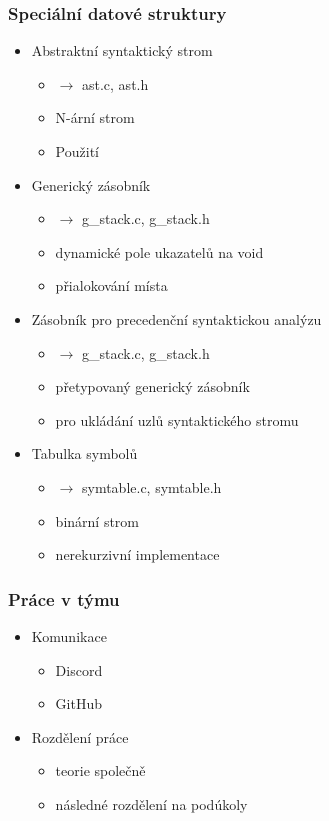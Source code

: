 \documentclass[10pt]{beamer}
\begin{document}

\begin{frame}
\frametitle{Speciální datové struktury}
\begin{itemize}[<+->]
\item Abstraktní syntaktický strom
	\begin{itemize}[<2->]
	\item $\rightarrow$ ast.c, ast.h
	\item N-ární strom
	\item Použití
	\end{itemize}
\pause
\vspace{0.2cm}
\item Generický zásobník
	\begin{itemize}[<4->]
	\item $\rightarrow$ g\_stack.c, g\_stack.h
	\item dynamické pole ukazatelů na void
	\item přialokování místa
	\end{itemize}
\pause
\vspace{0.2cm}
\item Zásobník pro precedenční syntaktickou analýzu
	\begin{itemize}[<6->]
	\item $\rightarrow$ g\_stack.c, g\_stack.h
	\item přetypovaný generický zásobník
	\item pro ukládání uzlů syntaktického stromu
	\end{itemize}
\pause
\vspace{0.2cm}
\item Tabulka symbolů
	\begin{itemize}[<8->]
	\item $\rightarrow$ symtable.c, symtable.h
	\item binární strom
	\item nerekurzivní implementace
	\end{itemize}
\end{itemize}
\end{frame}


\begin{frame}
\frametitle{Práce v týmu}
\begin{itemize}[<+->]
\item Komunikace
	\begin{itemize}[<2->]
	\item Discord
	\item GitHub
	\end{itemize}
\pause
\vspace{0.2cm}
\item Rozdělení práce
	\begin{itemize}[<4->]
	\item teorie společně
	\item následné rozdělení na podúkoly
	\end{itemize}
\end{itemize}
\end{frame}
\end{document}
